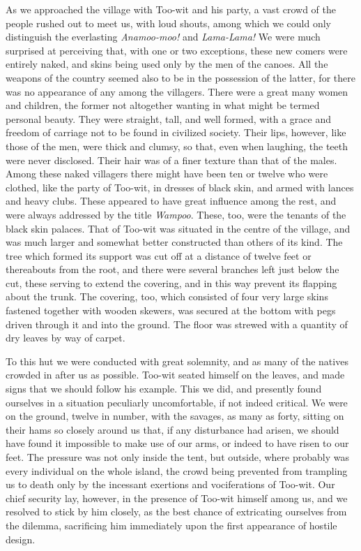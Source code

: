 As we approached the village with Too-wit and his party, a vast crowd of the
people rushed out to meet us, with loud shouts, among which we could only
distinguish the everlasting \emph{Anamoo-moo!} and \emph{Lama-Lama!} We were
much surprised at perceiving that, with one or two exceptions, these new comers
were entirely naked, and skins being used only by the men of the canoes. All the
weapons of the country seemed also to be in the possession of the latter, for
there was no appearance of any among the villagers. There were a great many
women and children, the former not altogether wanting in what might be termed
personal beauty. They were straight, tall, and well formed, with a grace and
freedom of carriage not to be found in civilized society. Their lips, however,
like those of the men, were thick and clumsy, so that, even when laughing, the
teeth were never disclosed. Their hair was of a finer texture than that of the
males. Among these naked villagers there might have been ten or twelve who were
clothed, like the party of Too-wit, in dresses of black skin, and armed with
lances and heavy clubs. These appeared to have great influence among the rest,
and were always addressed by the title \emph{Wampoo}. These, too, were the
tenants of the black skin palaces. That of Too-wit was situated in the centre of
the village, and was much larger and somewhat better constructed than others of
its kind. The tree which formed its support was cut off at a distance of twelve
feet or thereabouts from the root, and there were several branches left just
below the cut, these serving to extend the covering, and in this way prevent its
flapping about the trunk. The covering, too, which consisted of four very large
skins fastened together with wooden skewers, was secured at the bottom with pegs
driven through it and into the ground. The floor was strewed with a quantity of
dry leaves by way of carpet. 

To this hut we were conducted with great solemnity, and as many of the
natives crowded in after us as possible. Too-wit seated himself on the leaves,
and made signs that we should follow his example. This we did, and presently
found ourselves in a situation peculiarly uncomfortable, if not indeed critical.
We were on the ground, twelve in number, with the savages, as many as forty,
sitting on their hams so closely around us that, if any disturbance had arisen,
we should have found it impossible to make use of our arms, or indeed to have
risen to our feet. The pressure was not only inside the tent, but outside, where
probably was every individual on the whole island, the crowd being prevented
from trampling us to death only by the incessant exertions and vociferations of
Too-wit. Our chief security lay, however, in the presence of Too-wit himself
among us, and we resolved to stick by him closely, as the best chance of
extricating ourselves from the dilemma, sacrificing him immediately upon the
first appearance of hostile design. 

